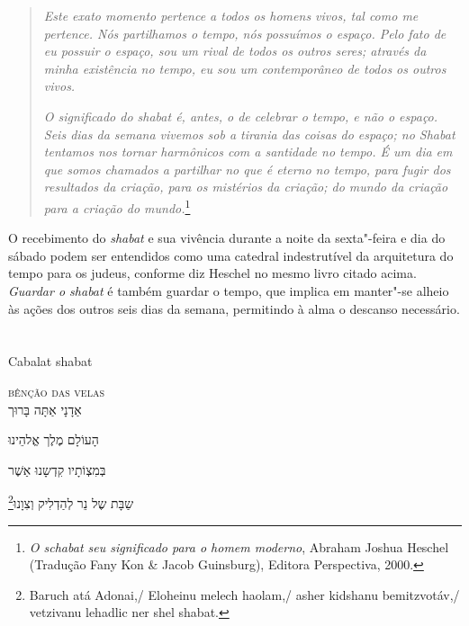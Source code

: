 \begin{quote}
\emph{Este exato momento pertence a todos os homens vivos, tal como me
pertence. Nós partilhamos o tempo, nós possuímos o espaço. Pelo fato de
eu possuir o espaço, sou um rival de todos os outros seres; através da
minha existência no tempo, eu sou um contemporâneo de todos os outros
vivos.}

\emph{O significado do shabat é, antes, o de celebrar o tempo, e não o
espaço. Seis dias da semana vivemos sob a tirania das coisas do espaço;
no Shabat tentamos nos tornar harmônicos com a santidade no tempo. É um
dia em que somos chamados a partilhar no que é eterno no tempo, para
fugir dos resultados da criação, para os mistérios da criação; do mundo
da criação para a criação do mundo.}\footnote{\emph{O schabat seu significado para o homem moderno}, Abraham Joshua Heschel (Tradução Fany Kon \& Jacob Guinsburg), Editora Perspectiva, 2000.}
\end{quote}

O recebimento do \emph{shabat} e sua vivência durante a noite da sexta"-feira e
dia do sábado podem ser entendidos como uma catedral indestrutível da
arquitetura do tempo para os judeus, conforme diz Heschel no mesmo livro
citado acima. \emph{Guardar o shabat} é também guardar o tempo, que implica em
manter"-se alheio às ações dos outros seis dias da semana, permitindo à
alma o descanso necessário.


\chapter*{}
\begin{center}
\begin{vplace}[0.3]
\Large
Cabalat shabat
\end{vplace}
\end{center}
\thispagestyle{empty}


\movetoevenpage
\raggedleft

\textsc{bênção das velas}\\[15pt]

אַדָנָי אַתָּה בָּרוּך

הָעוֹלָם מֶלֶך אֱלהֵינוּ

בְּמִצְוֹתָיו קִדְשָנוּ אַשֶׁר

שַבָּת שֶל נֵר לְהַדְלִיק וְצִוָנוּ‏\footnote{Baruch atá Adonai,/ Eloheinu melech haolam,/ asher kidshanu bemitzvotáv,/ vetzivanu lehadlic ner shel shabat.}

